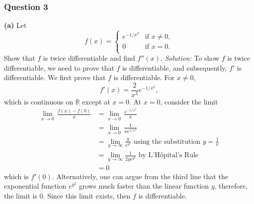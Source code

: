\documentclass{article}
\begin{document}
\subsubsection*{Question 3}
\textbf{(a)} Let \[f\left( x \right)=\left\{ \begin{matrix}
   {{e}^{-1/{{x}^{2}}}} & \text{if }x\ne 0,  \\
   0 & \text{if }x=0.  \\
\end{matrix} \right.\]
Show that $f$ is twice differentiable and find $f''(x)$.
\newline
\newline\textit{Solution:} To show $f$ is twice differentiable, we need to prove that $f$ is differentiable, and subsequently, $f'$ is differentiable. 
\newline\newline We first prove that $f$ is differentiable. For $x\ne 0$, \[f'(x)=\frac{2}{x^3}e^{-1/x^2},\] which is continuous on $\mathbb{R}$ except at $x=0$. At $x=0$, consider the limit \begin{align*}
    \underset{x\to 0}{\mathop{\lim }}\,\frac{f(x)-f(0)}{x}&=\underset{x\to 0}{\mathop{\lim }}\,\frac{{{e}^{-1/{{x}^{2}}}}}{x}\\
    &=\underset{x\to 0}{\mathop{\lim }}\,\frac{1}{x{{e}^{1/{{x}^{2}}}}}\\
    &=\lim_{y\rightarrow \infty}\frac{y}{e^y^2}\text{ using the substitution }y=\frac{1}{x}\\
    &=\lim_{y\rightarrow\infty}\frac{1}{2ye^y^2} \text{ by L'Hôpital's Rule}\\
    &=0
\end{align*}  which is $f'(0)$. Alternatively, one can argue from the third line that the exponential function $e^y^2$ grows much faster than the linear function $y$, therefore, the limit is 0. Since this limit exists, then $f$ is differentiable.
\newline
\end{document}

